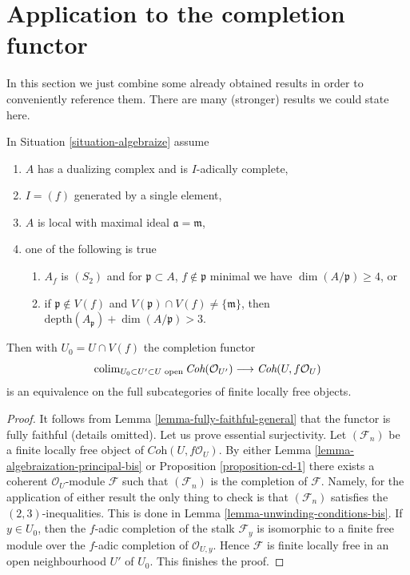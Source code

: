 \section{Application to the completion functor}
\label{section-completion-application}

\noindent
In this section we just combine some already obtained results
in order to conveniently reference them. There are many
(stronger) results we could state here.

\begin{lemma}
\label{lemma-equivalence-better}
In Situation \ref{situation-algebraize} assume
\begin{enumerate}
\item $A$ has a dualizing complex and is $I$-adically complete,
\item $I = (f)$ generated by a single element,
\item $A$ is local with maximal ideal $\mathfrak a = \mathfrak m$,
\item one of the following is true
\begin{enumerate}
\item $A_f$ is $(S_2)$ and for $\mathfrak p \subset A$,
$f \not \in \mathfrak p$ minimal we have $\dim(A/\mathfrak p) \geq 4$, or
\item if $\mathfrak p \not \in V(f)$ and
$V(\mathfrak p) \cap V(f) \not = \{\mathfrak m\}$, then
$\text{depth}(A_\mathfrak p) + \dim(A/\mathfrak p) > 3$.
\end{enumerate}
\end{enumerate}
Then with $U_0 = U \cap V(f)$ the completion functor
$$
\mathop{\mathrm{colim}}\nolimits_{U_0 \subset U' \subset U\text{ open}}
\textit{Coh}(\mathcal{O}_{U'})
\longrightarrow
\textit{Coh}(U, f\mathcal{O}_U)
$$
is an equivalence on the full subcategories of finite locally free objects.
\end{lemma}

\begin{proof}
It follows from Lemma \ref{lemma-fully-faithful-general}
that the functor is fully faithful (details omitted).
Let us prove essential surjectivity. Let $(\mathcal{F}_n)$ be a finite locally
free object of $\textit{Coh}(U, f\mathcal{O}_U)$. By either
Lemma \ref{lemma-algebraization-principal-bis} or
Proposition \ref{proposition-cd-1}
there exists a coherent $\mathcal{O}_U$-module $\mathcal{F}$
such that $(\mathcal{F}_n)$ is the completion of $\mathcal{F}$.
Namely, for the application of either result the only thing to
check is that $(\mathcal{F}_n)$ satisfies the $(2, 3)$-inequalities.
This is done in Lemma \ref{lemma-unwinding-conditions-bis}. If $y \in U_0$,
then the $f$-adic completion of the stalk $\mathcal{F}_y$ is isomorphic to
a finite free module over the $f$-adic completion of $\mathcal{O}_{U, y}$.
Hence $\mathcal{F}$ is finite locally free in an open neighbourhood
$U'$ of $U_0$. This finishes the proof.
\end{proof}

